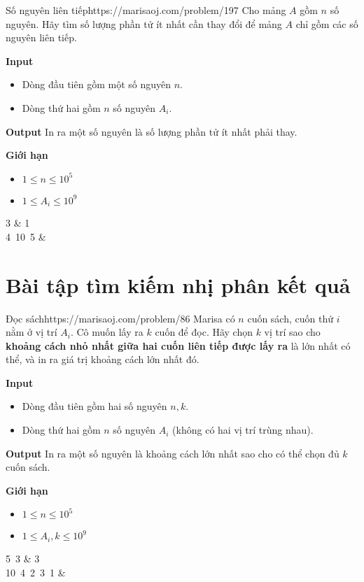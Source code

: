 \begin{baitap}{Số nguyên liên tiếp}{https://marisaoj.com/problem/197}
Cho mảng $A$ gồm $n$ số nguyên. Hãy tìm số lượng phần tử ít nhất cần thay đổi để mảng $A$ chỉ gồm các số nguyên liên tiếp.

\textbf{Input}
\begin{itemize}
    \item Dòng đầu tiên gồm một số nguyên $n$.
    \item Dòng thứ hai gồm $n$ số nguyên $A_i$.
\end{itemize}

\textbf{Output}
In ra một số nguyên là số lượng phần tử ít nhất phải thay.

\textbf{Giới hạn}
\begin{itemize}
    \item $1 \le n \le 10^5$
    \item $1 \le A_i \le 10^9$
\end{itemize}

\begin{simple_example}
3 & 1 \\
4\ 10\ 5 & \\
\end{simple_example}
\end{baitap}

\section{Bài tập tìm kiếm nhị phân kết quả}

\begin{baitap}{Đọc sách}{https://marisaoj.com/problem/86}
Marisa có $n$ cuốn sách, cuốn thứ $i$ nằm ở vị trí $A_i$. Cô muốn lấy ra $k$ cuốn để đọc. Hãy chọn $k$ vị trí sao cho \textbf{khoảng cách nhỏ nhất giữa hai cuốn liên tiếp được lấy ra} là lớn nhất có thể, và in ra giá trị khoảng cách lớn nhất đó.

\textbf{Input}
\begin{itemize}
    \item Dòng đầu tiên gồm hai số nguyên $n, k$.
    \item Dòng thứ hai gồm $n$ số nguyên $A_i$ (không có hai vị trí trùng nhau).
\end{itemize}

\textbf{Output}
In ra một số nguyên là khoảng cách lớn nhất sao cho có thể chọn đủ $k$ cuốn sách.

\textbf{Giới hạn}
\begin{itemize}
    \item $1 \le n \le 10^5$
    \item $1 \le A_i, k \le 10^9$
\end{itemize}

\begin{simple_example}
5\ 3 & 3 \\
10\ 4\ 2\ 3\ 1 & \\
\end{simple_example}
\end{baitap}

